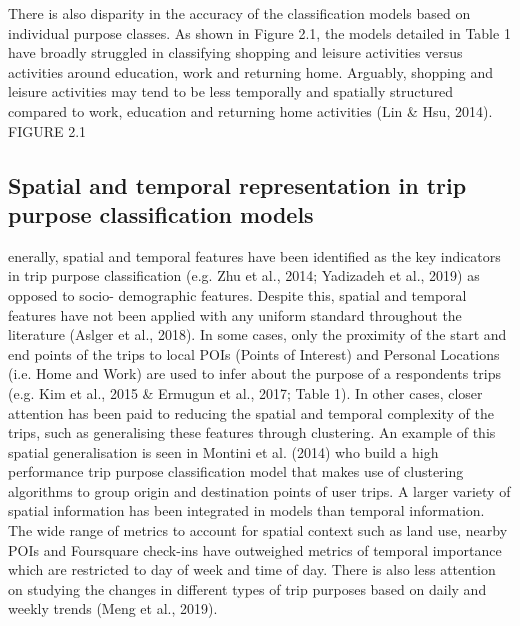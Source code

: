 There is also disparity in the accuracy of the classification models based on individual purpose classes. As shown in Figure 2.1, the models detailed in Table 1 have broadly struggled in classifying shopping and leisure activities versus activities around education, work and returning home. Arguably, shopping and leisure activities may tend to be less temporally and spatially structured compared to work, education and returning home activities (Lin \& Hsu, 2014).
 FIGURE 2.1 
\\
\subsection{Spatial and temporal representation in trip purpose classification models}
enerally, spatial and temporal features have been identified as the key indicators in trip purpose classification (e.g. Zhu et al., 2014; Yadizadeh et al., 2019) as opposed to socio- demographic features. Despite this, spatial and temporal features have not been applied with any uniform standard throughout the literature (Aslger et al., 2018).
In some cases, only the proximity of the start and end points of the trips to local POIs (Points of Interest) and Personal Locations (i.e. Home and Work) are used to infer about the
purpose of a respondents trips (e.g. Kim et al., 2015 \& Ermugun et al., 2017; Table 1). In other cases, closer attention has been paid to reducing the spatial and temporal complexity of the trips, such as generalising these features through clustering. An example of this spatial generalisation is seen in Montini et al. (2014) who build a high performance trip purpose classification model that makes use of clustering algorithms to group origin and destination points of user trips.
A larger variety of spatial information has been integrated in models than temporal information. The wide range of metrics to account for spatial context such as land use, nearby POIs and Foursquare check-ins have outweighed metrics of temporal importance which are restricted to day of week and time of day. There is also less attention on studying the changes in different types of trip purposes based on daily and weekly trends (Meng et al., 2019).

